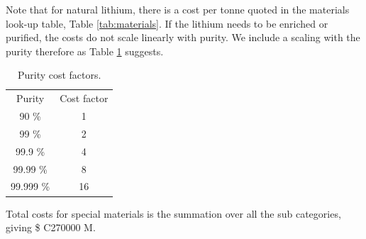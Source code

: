 Note that for natural lithium, there is a cost per tonne quoted in the materials look-up table, Table \ref{tab:materials}.  If the lithium needs to be enriched or purified, the costs do not scale linearly with purity.  We include a scaling with the purity therefore as Table \ref{tab:purity} suggests.

\begin{table}[]
    \centering
    \begin{tabular}{c|c}
        Purity  &  Cost factor \\
        90 \%  &  1 \\
        99 \%  &  2 \\
        99.9 \%  &  4 \\
        99.99 \%  &  8 \\
        99.999 \%  &  16 \\
    \end{tabular}
    \caption{Purity cost factors.}
    \label{tab:purity}
\end{table}

Total costs for special materials is the summation over all the sub categories, giving \$ C270000 M.


